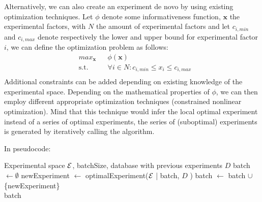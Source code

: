 \documentclass{article}
\begin{document}
Alternatively, we can also create an experiment de novo by using existing optimization techniques. Let $\phi$ denote some informativeness function, $\mathbf{x}$ the experimental factors, with $N$ the amount of experimental factors 
and let $c_{i,min}$ and $c_{i,max}$ denote respectively the lower and upper bound for experimental factor $i$, we can define the optimization problem as follows:
\begin{equation}\label{eq:opt_data_select}
 \begin{aligned}
  & max_{\mathbf{x}} & & \phi(\mathbf{x}) \\
  & \text{s.t.} & & \forall i \in N: c_{i,min} \leq x_i \leq c_{i,max} \\
 \end{aligned}
\end{equation}	
Additional constraints can be added depending on existing knowledge of the experimental space.
Depending on the mathematical properties of $\phi$, we can then employ different appropriate optimization techniques (constrained nonlinear optimization).
Mind that this technique would infer the local optimal experiment instead of a series of optimal experiments, the series of (suboptimal) experiments is generated by iteratively calling the algorithm.

In pseudocode:
\begin{algorithmic}
  \Require Experimental space $\mathcal{E}$, batchSize, database with previous experiments $D$ 
  \State  batch $\leftarrow \emptyset$ 
  \State newExperiment $\leftarrow$ optimalExperiment($\mathcal{E}$ | batch, $D$ )
  \State batch $\leftarrow$ batch $\cup$ \{newExperiment\} 
  \EndWhile \\ 
  \Return batch 
  \EndFunction 
\end{algorithmic} 
 
 
\end{document}
